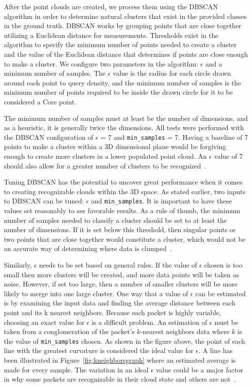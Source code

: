 After the point clouds are created, we process them using the DBSCAN algorithm in order to determine natural clusters that exist in the provided classes in the ground truth. DBSCAN works by grouping points that are close together utilizing a Euclidean distance for measurements. Thresholds exist in the algorithm to specify the minimum number of points needed to create a cluster and the value of the Euclidean distance that determines if points are close enough to make a cluster. We configure two parameters in the algorithm: $\epsilon$ and a minimum number of samples. The $\epsilon$ value is the radius for each circle drawn around each point to query density, and the minimum number of samples is the minimum number of points required to be inside the drawn circle for it to be considered a Core point.

The minimum number of samples must at least be the number of dimensions, and as a heuristic, it is generally twice the dimensions. All tests were performed with the DBSCAN configuration of $\epsilon$ = 7 and \texttt{min\_samples} = 7. Having a baseline of 7 points to make a cluster within a 3D dimensional plane would be forgiving enough to create more clusters in a lower populated point cloud. An $\epsilon$ value of 7 should also allow for a greater number of clusters to be recognized~\cite{rahmah2016determination}.

Tuning DBSCAN has the potential to uncover great performance when it comes to creating recognizable clouds within the 3D space. As stated earlier, two inputs to DBSCAN can be tuned: $\epsilon$ and \texttt{min\_samples}. It is important to have these values set reasonably to see favorable results. As a rule of thumb, the minimum number of samples needed to classify a cluster should be set to at least the number of dimensions. If it is set below this threshold, then singular points or two points that are close together would constitute a cluster, which would not be an accurate way of determining where data is clumped~\cite{mullin2020tuning}.

Similarly, $\epsilon$ needs to be set based on general rules. If the value of $\epsilon$ chosen is too small then more clusters will be created, and more data points will be taken as noise. However, if set too large, then a number of smaller clusters will be more likely to merge into one large cluster. One way that a value of $\epsilon$ can be estimated is by examining the input data and finding the average distance between each point and its k nearest neighbors. Because each packet is highly variable, choosing an exact value for $\epsilon$ is a difficult problem. An estimation of $\epsilon$ must be taken from a conglomeration of the packet's $k$-nearest neighbors data where $k$ is the value of \texttt{min\_samples} chosen. As shown in the figure above, the point of each line with the greatest curvature is considered the ideal value for $\epsilon$. A line has been illustrated in Figure~\ref{fig:kneighborsgraph} where an estimated average is made for every sample. The variation in an ideal $\epsilon$ value could be a major factor in why some packets are recognizable in their cloud state and others are not~\cite{rahmah2016determination}.

